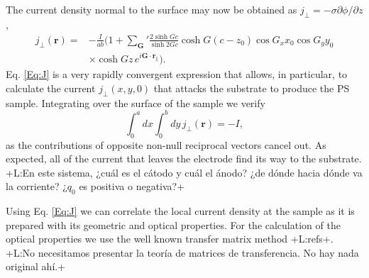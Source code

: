 \documentclass{article}
\newcommand{\notaL}[1]{{\color{blue}+L:#1+}}
\begin{document}
The current density normal to the surface may now be obtained as
$j_\perp=-\sigma\partial\phi/\partial z$,
\begin{equation}
  \label{Eq:J}
  \begin{split}
    j_\perp(\bm r) =& -\frac{I}{ab}\biggl(1+{\sum_{\bm G}}'\frac{2\sinh
      Gc}{\sinh 2Gc}\cosh G(c-z_0)\cos G_x x_0 \cos G_y y_0\\
    &\times \cosh Gz\, e^{i\bm G\cdot\bm r_\|}\biggr).
  \end{split}
\end{equation}
Eq. \eqref{Eq:J} is a very rapidly convergent expression that allows,
in particular, to calculate the current $j_\perp(x,y,0)$ that attacks
the substrate to produce the PS sample.
Integrating over the surface of the sample we verify
\begin{equation}
  \label{eq:intj}
  \int_0^adx\int_0^bdy\,j_\perp(\bm r)=-I,
\end{equation}
as the contributions of opposite non-null reciprocal vectors cancel
out. As expected, all of the current that leaves the electrode find
its way to the substrate.
\notaL{En este sistema, ¿cuál es el cátodo y cuál el ánodo? ¿de dónde
  hacia dónde va la corriente? ¿$q_0$ es positiva o negativa?}

Using Eq. \eqref{Eq:J} we can correlate the local current density at
the sample as it is prepared with its geometric and optical
properties. For the calculation of the optical properties we use the
well known transfer matrix method \notaL{refs}.
\notaL{No necesitamos presentar la teoría de matrices de
  transferencia. No hay nada original ahí.}
\end{document}
